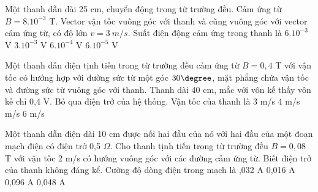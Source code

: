 \begin{vidu}%
Một thanh dẫn dài 25 cm, chuyển động trong từ trường đều. Cảm ứng từ $B = 8. 10^{-3}$ T. Vector vận tốc vuông góc với thanh và cũng vuông góc với vector cảm ứng từ, có độ lớn $v = 3\ m/s$. Suất điện động cảm ứng trong thanh là
\choice
{\True $6. 10^{-3}$ V}
{$3. 10^{-3}$ V}
{$6. 10^{-4}$ V}
{$6. 10^{-5}$ V}
\end{vidu}
\begin{vidu}%
Một thanh dẫn điện tịnh tiến trong từ trường đều cảm ứng từ $B = 0,4$ T với vận tốc có hướng hợp với đường sức từ một góc $30\degree$, mặt phẳng chứa vận tốc và đường sức từ vuông góc với thanh. Thanh dài 40 cm, mắc với vôn kế thấy vôn kế chỉ 0,4 V. Bỏ qua điện trở của hệ thống. Vận tốc của thanh là
\choice
{3 m/s}
{4 m/s}
{ m/s}
{6 m/s}
\end{vidu}
\begin{vidu}%
Một thanh dẫn điện dài 10 cm được nối hai đầu của nó với hai đầu của một đoạn mạch điện có điện trở 0,5 $\Omega$. Cho thanh tịnh tiến trong từ trường đều $B = 0,08$ T với vận tốc 2 m/s có hướng vuông góc với các đường cảm ứng từ. Biết điện trở của thanh không đáng kể. Cường độ dòng điện trong mạch là
\choice
{,032 A}
{0,016 A}
{0,096 A}
{0,048 A}
\end{vidu}
